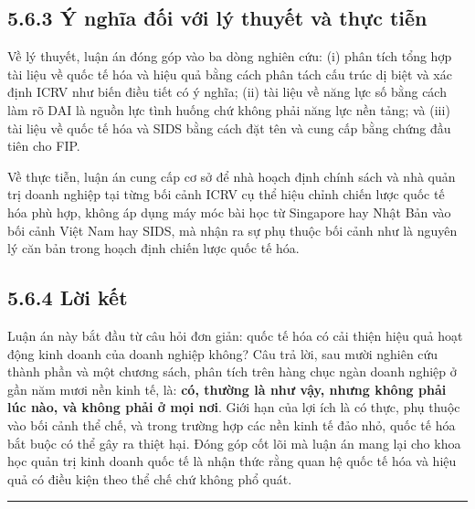 \documentclass[
  a4paper,
  13pt]{extreport}
\begin{document}
\hypertarget{uxfd-nghux129a-ux111ux1ed1i-vux1edbi-luxfd-thuyux1ebft-vuxe0-thux1ef1c-tiux1ec5n}{%
\subsection{5.6.3 Ý nghĩa đối với lý thuyết và thực
tiễn}\label{uxfd-nghux129a-ux111ux1ed1i-vux1edbi-luxfd-thuyux1ebft-vuxe0-thux1ef1c-tiux1ec5n}}

Về lý thuyết, luận án đóng góp vào ba dòng nghiên cứu: (i) phân tích
tổng hợp tài liệu về quốc tế hóa và hiệu quả bằng cách phân tách cấu
trúc dị biệt và xác định ICRV như biến điều tiết có ý nghĩa; (ii) tài
liệu về năng lực số bằng cách làm rõ DAI là nguồn lực tình huống chứ
không phải năng lực nền tảng; và (iii) tài liệu về quốc tế hóa và SIDS
bằng cách đặt tên và cung cấp bằng chứng đầu tiên cho FIP.

Về thực tiễn, luận án cung cấp cơ sở để nhà hoạch định chính sách và nhà
quản trị doanh nghiệp tại từng bối cảnh ICRV cụ thể hiệu chỉnh chiến
lược quốc tế hóa phù hợp, không áp dụng máy móc bài học từ Singapore hay
Nhật Bản vào bối cảnh Việt Nam hay SIDS, mà nhận ra sự phụ thuộc bối
cảnh như là nguyên lý căn bản trong hoạch định chiến lược quốc tế hóa.

\hypertarget{lux1eddi-kux1ebft}{%
\subsection{5.6.4 Lời kết}\label{lux1eddi-kux1ebft}}

Luận án này bắt đầu từ câu hỏi đơn giản: quốc tế hóa có cải thiện hiệu
quả hoạt động kinh doanh của doanh nghiệp không? Câu trả lời, sau mười
nghiên cứu thành phần và một chương sách, phân tích trên hàng chục ngàn
doanh nghiệp ở gần năm mươi nền kinh tế, là: \textbf{có, thường là như
vậy, nhưng không phải lúc nào, và không phải ở mọi nơi}. Giới hạn của
lợi ích là có thực, phụ thuộc vào bối cảnh thể chế, và trong trường hợp
các nền kinh tế đảo nhỏ, quốc tế hóa bắt buộc có thể gây ra thiệt hại.
Đóng góp cốt lõi mà luận án mang lại cho khoa học quản trị kinh doanh
quốc tế là nhận thức rằng quan hệ quốc tế hóa và hiệu quả có điều kiện
theo thể chế chứ không phổ quát.

\begin{center}\rule{0.5\linewidth}{0.5pt}\end{center}
\end{document}
